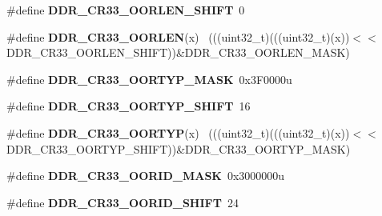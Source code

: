 \begin{DoxyCompactItemize}
\item 
\hypertarget{group___d_d_r___register___masks_gaa7ba2276b3a75726280e189daefc8a02}{}\#define {\bfseries D\+D\+R\+\_\+\+C\+R33\+\_\+\+O\+O\+R\+L\+E\+N\+\_\+\+S\+H\+I\+F\+T}~0\label{group___d_d_r___register___masks_gaa7ba2276b3a75726280e189daefc8a02}

\item 
\hypertarget{group___d_d_r___register___masks_gaf993ee736c0bebd6703b323b4dc10cc3}{}\#define {\bfseries D\+D\+R\+\_\+\+C\+R33\+\_\+\+O\+O\+R\+L\+E\+N}(x)                                          ~(((uint32\+\_\+t)(((uint32\+\_\+t)(x))$<$$<$D\+D\+R\+\_\+\+C\+R33\+\_\+\+O\+O\+R\+L\+E\+N\+\_\+\+S\+H\+I\+F\+T))\&D\+D\+R\+\_\+\+C\+R33\+\_\+\+O\+O\+R\+L\+E\+N\+\_\+\+M\+A\+S\+K)\label{group___d_d_r___register___masks_gaf993ee736c0bebd6703b323b4dc10cc3}

\item 
\hypertarget{group___d_d_r___register___masks_ga9c23171c107566a445bab5fb5297f787}{}\#define {\bfseries D\+D\+R\+\_\+\+C\+R33\+\_\+\+O\+O\+R\+T\+Y\+P\+\_\+\+M\+A\+S\+K}~0x3\+F0000u\label{group___d_d_r___register___masks_ga9c23171c107566a445bab5fb5297f787}

\item 
\hypertarget{group___d_d_r___register___masks_ga695e17a46391a69ddf2ddcb3b52be747}{}\#define {\bfseries D\+D\+R\+\_\+\+C\+R33\+\_\+\+O\+O\+R\+T\+Y\+P\+\_\+\+S\+H\+I\+F\+T}~16\label{group___d_d_r___register___masks_ga695e17a46391a69ddf2ddcb3b52be747}

\item 
\hypertarget{group___d_d_r___register___masks_gaac93e1eb8478193f34be5afbea948ab1}{}\#define {\bfseries D\+D\+R\+\_\+\+C\+R33\+\_\+\+O\+O\+R\+T\+Y\+P}(x)                                          ~(((uint32\+\_\+t)(((uint32\+\_\+t)(x))$<$$<$D\+D\+R\+\_\+\+C\+R33\+\_\+\+O\+O\+R\+T\+Y\+P\+\_\+\+S\+H\+I\+F\+T))\&D\+D\+R\+\_\+\+C\+R33\+\_\+\+O\+O\+R\+T\+Y\+P\+\_\+\+M\+A\+S\+K)\label{group___d_d_r___register___masks_gaac93e1eb8478193f34be5afbea948ab1}

\item 
\hypertarget{group___d_d_r___register___masks_ga0eeac50cede920b060e4532dcd4165e9}{}\#define {\bfseries D\+D\+R\+\_\+\+C\+R33\+\_\+\+O\+O\+R\+I\+D\+\_\+\+M\+A\+S\+K}~0x3000000u\label{group___d_d_r___register___masks_ga0eeac50cede920b060e4532dcd4165e9}

\item 
\hypertarget{group___d_d_r___register___masks_ga7c4b5f103918a7e09c58964fcc8fe3d4}{}\#define {\bfseries D\+D\+R\+\_\+\+C\+R33\+\_\+\+O\+O\+R\+I\+D\+\_\+\+S\+H\+I\+F\+T}~24\label{group___d_d_r___register___masks_ga7c4b5f103918a7e09c58964fcc8fe3d4}


\end{DoxyCompactItemize}

